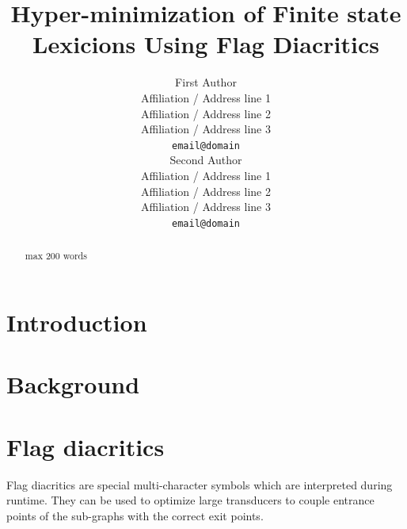 \documentclass[11pt]{article}
\title{Hyper-minimization of Finite state Lexicions Using Flag Diacritics}
\author{First Author \\
  Affiliation / Address line 1 \\
  Affiliation / Address line 2 \\
  Affiliation / Address line 3 \\
  {\tt email@domain} \\\And
  Second Author \\
  Affiliation / Address line 1 \\
  Affiliation / Address line 2 \\
  Affiliation / Address line 3 \\
  {\tt email@domain} \\}
\date{}
\begin{document}
\maketitle
\begin{abstract}
  max 200 words
\end{abstract}




\section{Introduction}
%
% 

\section{Background}
\label{sec:background}

 
\section{Flag diacritics}
\label{sec:flags}

Flag diacritics are special multi-character symbols which are interpreted during runtime. They can be used to optimize large transducers to couple entrance points of the sub-graphs with the correct exit points.
\end{document}
